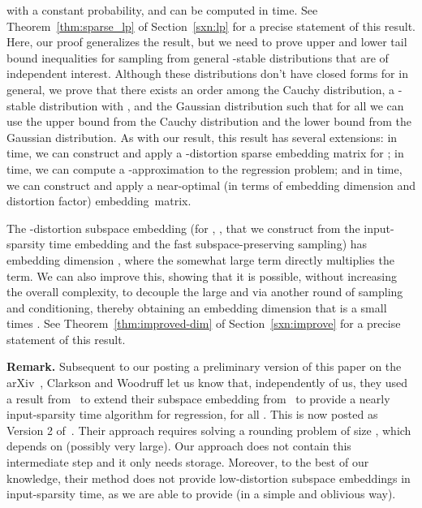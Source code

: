 \documentclass[11pt]{article}
\begin{document}
\begin{itemize}
  with a constant probability, and  can be computed in 
  time.
  See Theorem~\ref{thm:sparse_lp} of Section~\ref{sxn:lp} for a precise
  statement of this result.
  Here, our proof generalizes the  result, but we need to prove upper
  and lower tail bound inequalities for sampling from general -stable
  distributions that are of independent interest.
  Although these distributions don't have closed forms for  in
  general, we prove that there exists an order among the Cauchy distribution, a
  -stable distribution with , and the Gaussian distribution such
  that for all  we can use the upper bound from the Cauchy
  distribution and the lower bound from the Gaussian distribution.
  As with our  result, this  result has several extensions: in
   time, we can construct and
  apply a -distortion sparse embedding matrix for ; in
   time, we can compute a
  -approximation to the  regression problem; and in
   time, we can construct and apply a
  near-optimal (in terms of embedding dimension and distortion factor) 
  embedding~matrix.
\end{itemize}

\noindent
The -distortion subspace embedding (for , ,
that we construct from the input-sparsity time embedding and the fast
subspace-preserving sampling) has embedding dimension , where the somewhat large 
term directly multiplies the  term. 
We can also improve this, showing that it is possible, without increasing the
overall complexity, to decouple the large  and
 via another round of sampling and conditioning,
thereby obtaining an embedding dimension that is a small  times
. 
See Theorem~\ref{thm:improved-dim} of Section~\ref{sxn:improve} for a precise
statement of this result.  

\bigskip

\textbf{Remark.}
Subsequent to our posting a preliminary version of this paper on the
arXiv~\cite{MM12_TR}, Clarkson and Woodruff let us know that, independently of
us, they used a result from~\cite{CDMMMW13_SODA} to extend their 
subspace embedding from~\cite{CW12sparse_TR} to provide a nearly input-sparsity
time algorithm for  regression, for all .
This is now posted as Version 2 of~\cite{CW12sparse_TR}.
Their approach requires solving a rounding problem of size , which depends on  (possibly very large).
Our approach does not contain this intermediate step and it only needs
 storage.
Moreover, to the best of our knowledge, their method does not provide
low-distortion  subspace embeddings in input-sparsity time, as we are
able to provide (in a simple and oblivious way).
\end{document}

